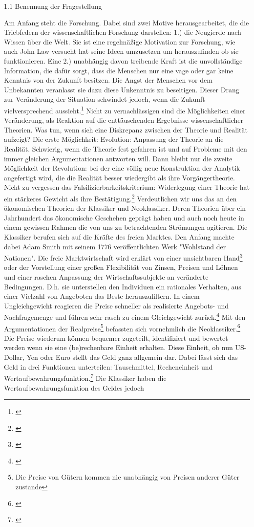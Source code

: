 1.1 Benennung der Fragestellung

Am Anfang steht die Forschung. Dabei sind zwei Motive herausgearbeitet, die die Triebfedern der wissenschaftlichen Forschung darstellen:
1.) die Neugierde nach Wissen über die Welt. Sie ist eine regelmäßige Motivation zur Forschung, wie auch John Law versucht hat seine Ideen umzusetzen um herauszufinden ob sie funktionieren.
Eine 2.) unabhängig davon treibende Kraft ist die unvollständige Information, die dafür sorgt, dass die Menschen nur eine vage oder gar keine Kenntnis von der Zukunft besitzen. Die Angst der Menschen vor dem Unbekannten veranlasst sie dazu diese Unkenntnis zu beseitigen. Dieser Drang zur Veränderung der Situation schwindet jedoch, wenn die Zukunft vielversprechend aussieht.\footnote[101]{ \citep[S.11]{bombach1981theorie}} Nicht zu vernachlässigen sind die Möglichkeiten einer Veränderung, als Reaktion auf die enttäuschenden Ergebnisse wissenschaftlicher Theorien. Was tun, wenn sich eine Diskrepanz zwischen der Theorie und Realität aufzeigt? Die erste Möglichkeit: Evolution: Anpassung der Theorie an die Realität. Schwierig, wenn die Theorie fest gefahren ist und auf Probleme mit den immer gleichen Argumentationen antworten will. Dann bleibt nur die zweite Möglichkeit der Revolution: bei der eine völlig neue Konstruktion der Analytik angefertigt wird, die die Realität besser wiedergibt als ihre Vorgängertheorie. Nicht zu vergessen das Falsifizierbarkeitskriterium: Widerlegung einer Theorie hat ein stärkeres Gewicht als ihre Bestätigung.\footnote[102]{\citep[S.161]{bombach1981theorie}} Verdeutlichen wir uns das an den ökonomischen Theorien der Klassiker und Neoklassiker. Deren Theorien über ein Jahrhundert das ökonomische Geschehen geprägt haben und auch noch heute in einem gewissen Rahmen die von uns zu betrachtenden Strömungen agitieren. Die Klassiker berufen sich auf die Kräfte des freien Marktes. Den Anfang machte dabei Adam Smith mit seinem 1776 veröffentlichten Werk "Wohlstand der Nationen". Die freie Marktwirtschaft wird erklärt von einer unsichtbaren Hand\footnote[103]{\citep[S.137]{bombach1981theorie}} oder der Vorstellung einer großen Flexibilität von Zinsen, Preisen und Löhnen und einer raschen Anpassung der Wirtschaftssubjekte an veränderte Bedingungen. D.h. sie unterstellen den Individuen ein rationales Verhalten, aus einer Vielzahl von Angeboten das Beste herauszufiltern. In einem Ungleichgewicht reagieren die Preise schneller als realisierte Angebots- und Nachfragemenge und führen sehr rasch zu einem Gleichgewicht zurück.\footnote[104]{\citep[S.291]{Basseler2010}} Mit den Argumentationen der Realpreise\footnote[105]{Die Preise von Gütern kommen nie unabhängig von Preisen anderer Güter zustande} befassten sich vornehmlich die Neoklassiker.\footnote[106]{\citep[S.138]{bombach1981theorie}} Die Preise wiederum können bequemer zugeteilt, identifiziert und bewertet werden wenn sie eine (be)rechenbare Einheit erhalten. Diese Einheit, ob nun US-Dollar, Yen oder Euro stellt das Geld ganz allgemein dar. Dabei lässt sich das Geld in drei Funktionen unterteilen: Tauschmittel, Recheneinheit und Wertaufbewahrungsfunktion.\footnote[107]{\citep[S.417]{Basseler2010}} Die Klassiker haben die Wertaufbewahrungsfunktion des Geldes jedoch 
